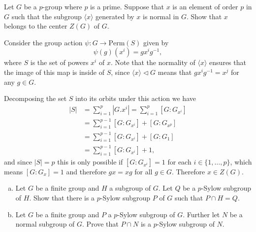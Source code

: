 \documentclass{article}
\newcounter{Problem}
\newenvironment{Problem}{\begin{Exercise}[name={Problem},
                                          counter={Problem}]}
                        {\end{Exercise}}
\begin{document}
\pagebreak
\begin{Problem}
Let $G$ be a $p$-group where $p$ is a prime. Suppose that $x$ is an
element of order $p$ in $G$ such that the subgroup $\langle x \rangle$
generated by $x$ is normal in $G$. Show that $x$ belongs to the center
$Z(G)$ of $G$.
\end{Problem}

\begin{Answer}
Consider the group action $\psi : G \to \mathrm{Perm}(S)$ given by
$$
\psi(g)(x^i) = g x^i g^{-1},
$$
where $S$ is the set of powers $x^i$ of $x$. Note that the normality
of $\langle x \rangle$ ensures that the image of this map is inside of
$S$, since $\langle x \rangle \triangleleft G$ means that
$g x^i g^{-1} = x^j$ for any $g \in G$.

Decomposing the set $S$ into its orbits under this action we have
\begin{align*}
|S| &= \sum_{i=1}^p |G . x^i| = \sum_{i=1}^p [G : G_{x^i}] \\
    &= \sum_{i=1}^{p-1} [G : G_{x^i}] + [G : G_{x^p}] \\
    &= \sum_{i=1}^{p-1} [G : G_{x^i}] + [G : G_1] \\
    &= \sum_{i=1}^{p-1} [G : G_{x^i}] + 1,
\end{align*}
and since $|S| = p$ this is only possible if $[G : G_{x^i}] = 1$ for
each $i \in \{ 1, \dots, p \}$, which means $[G : G_x] = 1$ and
therefore $gx = xg$ for all $g \in G$. Therefore $x \in Z(G)$.
\end{Answer}

\pagebreak
\begin{Problem}
\begin{enumerate}[(a)]
\item{Let $G$ be a finite group and $H$ a subgroup of $G$. Let $Q$ be
    a $p$-Sylow subgroup of $H$. Show that there is a $p$-Sylow
    subgroup $P$ of $G$ such that $P \cap H = Q$.}
\item{Let $G$ be a finite group and $P$ a $p$-Sylow subgroup of
    $G$. Further let $N$ be a normal subgroup of $G$. Prove that $P
    \cap N$ is a $p$-Sylow subgroup of $N$.}
\end{enumerate}
\end{Problem}
\end{document}
